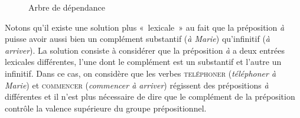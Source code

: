 \begin{figure}
\caption{Arbre de dépendance\label{fig:}}
\end{figure}

Notons qu’il existe une solution plus «~lexicale~» au fait que la préposition \textit{à} puisse avoir aussi bien un complément substantif (\textit{à Marie}) qu’infinitif (\textit{à arriver}). La solution consiste à considérer que la préposition \textit{à} a deux entrées lexicales différentes, l’une dont le complément est un substantif et l’autre un infinitif. Dans ce cas, on considère que les verbes \textsc{teléphoner} (\textit{téléphoner à Marie}) et \textsc{commencer} (\textit{commencer à arriver}) régissent des prépositions \textit{à} différentes et il n’est plus nécessaire de dire que le complément de la préposition contrôle la valence supérieure du groupe prépositionnel.



